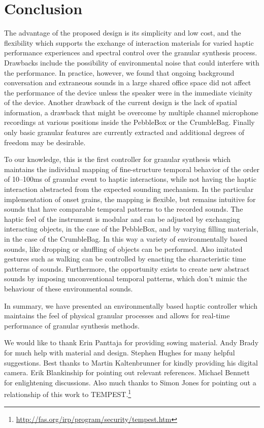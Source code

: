 \vfill
\section{Conclusion}

The advantage of the proposed design is its simplicity and low cost, and the flexibility which supports the exchange of interaction materials for varied haptic performance experiences and spectral control over the granular synthesis process. Drawbacks include the possibility of environmental noise that could interfere with the performance. In practice, however, we found that ongoing background conversation and extraneous sounds in a large shared office space  did not affect the performance of the device unless the speaker were in the immediate vicinity of the device. Another drawback of the current design is the lack of spatial information, a drawback that might be overcome by multiple channel microphone recordings at various positions inside the PebbleBox or the CrumbleBag. Finally only basic granular features are currently extracted and additional degrees of freedom may be desirable.

To our knowledge, this is the first controller for granular synthesis which maintains the individual mapping of fine-structure temporal behavior of the order of 10--100ms of granular event to haptic interactions, while not having the haptic interaction abstracted from the expected sounding mechanism. In the particular implementation of onset grains, the mapping is flexible, but remains intuitive for sounds that have comparable temporal patterns to the recorded sounds. The haptic feel of the instrument  is modular and can be adjusted by exchanging interacting objects, in the case of the PebbleBox, and by varying filling materials, in the case of the CrumbleBag. In this way a variety of environmentally based sounds, like dropping or shuffling of objects can be performed. Also imitated gestures such as walking can be controlled by enacting the characteristic time patterns of sounds. Furthermore, the opportunity exists to create new abstract sounds by imposing unconventional temporal patterns, which don't mimic the behaviour of these environmental sounds.

In summary, we have presented an environmentally based haptic controller which maintains the  feel of physical granular processes and allows for real-time performance of granular synthesis methods.

\begin{acknowledgement}
We would like to thank Erin Panttaja for providing sowing material. Andy Brady for much help with material and design. Stephen Hughes for many helpful suggestions. Best thanks to Martin Kaltenbrunner for kindly providing his digital camera. Erik Blankinship for pointing out relevant references. Michael Bennett for enlightening discussions. Also much thanks to Simon Jones for pointing out a relationship of this work to TEMPEST.\footnote{\url{http://fas.org/irp/program/security/tempest.htm}}
\end{acknowledgement}


